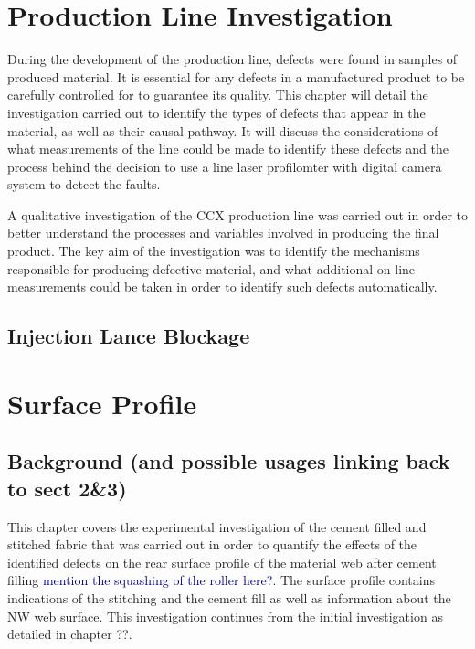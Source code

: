 \documentclass[12pt]{report}
\newcommand{\tcb}[1]{\textcolor{darkBlue}{#1}}
\begin{document}
\chapter{Production Line Investigation}

During the development of the production line, defects were found in samples of produced material. It is essential for any defects in a manufactured product to be carefully controlled for to guarantee its quality. This chapter will detail the investigation carried out to identify the types of defects that appear in the material, as well as their causal pathway. It will discuss the considerations of what measurements of the line could be made to identify these defects and the process behind the decision to use a line laser profilomter with digital camera system to detect the faults.
    
A qualitative investigation of the CCX production line was carried out in order to better understand the processes and variables involved in producing the final product. The key aim of the investigation was to identify the mechanisms responsible for producing defective material, and what additional on-line measurements could be taken in order to identify such defects automatically.
    
    \section{Injection Lance Blockage}
        

\chapter{Surface Profile}


\section{Background (and possible usages linking back to sect 2\&3)}

This chapter covers the experimental investigation of the cement filled and stitched fabric that was carried out in order to quantify the effects of the identified defects on the rear surface profile of the material web after cement filling \tcb{mention the squashing of the roller here?}. The surface profile contains indications of the stitching and the cement fill as well as information about the NW web surface. This investigation continues from the initial investigation as detailed in chapter ??. 
\end{document}
